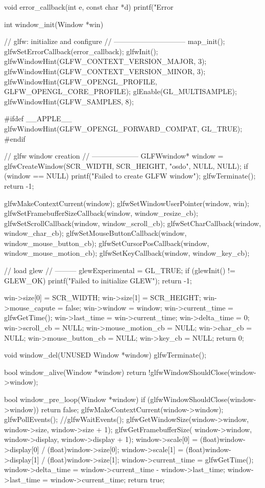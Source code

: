 \documentclass[14pt,a4paper]{extarticle}
\theoremstyle{definition}
\renewcommand{\[}{\begin{singlespace}\begin{equation*}}
\renewcommand{\]}{\end{equation*}\end{singlespace}}
\begin{document}
\begin{multicols}{2}
\begin{ccode}
void error_callback(int e, const char *d) {
    printf("Error %
}

int window_init(Window *win) {
    // glfw: initialize and configure
    // ------------------------------
    map_init();
    glfwSetErrorCallback(error_callback);
    glfwInit();
    glfwWindowHint(GLFW_CONTEXT_VERSION_MAJOR, 3);
    glfwWindowHint(GLFW_CONTEXT_VERSION_MINOR, 3);
    glfwWindowHint(GLFW_OPENGL_PROFILE, GLFW_OPENGL_CORE_PROFILE);
    glEnable(GL_MULTISAMPLE);
    glfwWindowHint(GLFW_SAMPLES, 8);

#ifdef __APPLE__
    glfwWindowHint(GLFW_OPENGL_FORWARD_COMPAT, GL_TRUE);
#endif

    // glfw window creation
    // --------------------
    GLFWwindow* window = glfwCreateWindow(SCR_WIDTH, SCR_HEIGHT, "osdo",
                                          NULL, NULL);
    if (window == NULL) {
        printf("Failed to create GLFW window\n");
        glfwTerminate();
        return -1;
    }

    glfwMakeContextCurrent(window);
    glfwSetWindowUserPointer(window, win);
    glfwSetFramebufferSizeCallback(window, window_resize_cb);
    glfwSetScrollCallback(window, window_scroll_cb);
    glfwSetCharCallback(window, window_char_cb);
    glfwSetMouseButtonCallback(window, window_mouse_button_cb);
    glfwSetCursorPosCallback(window, window_mouse_motion_cb);
    glfwSetKeyCallback(window, window_key_cb);

    // load glew
    // ---------
    glewExperimental = GL_TRUE;
    if (glewInit() != GLEW_OK) {
        printf("Failed to initialize GLEW\n");
        return -1;
    }

    win->size[0] = SCR_WIDTH;
    win->size[1] = SCR_HEIGHT;
    win->mouse_capute = false;
    win->window = window;
    win->current_time = glfwGetTime();
    win->last_time = win->current_time;
    win->delta_time = 0;
    win->scroll_cb = NULL;
    win->mouse_motion_cb = NULL;
    win->char_cb = NULL;
    win->mouse_button_cb = NULL;
    win->key_cb = NULL;
    return 0;
}

void window_del(UNUSED Window *window) {
    glfwTerminate();
}

bool window_alive(Window *window) {
    return !glfwWindowShouldClose(window->window);
}

bool window_pre_loop(Window *window) {
    if (glfwWindowShouldClose(window->window)) return false;
    glfwMakeContextCurrent(window->window);
    glfwPollEvents();
    //glfwWaitEvents();
    glfwGetWindowSize(window->window, window->size, window->size + 1);
    glfwGetFramebufferSize(
                window->window, window->display, window->display + 1);
    window->scale[0] = (float)window->display[0] / (float)window->size[0];
    window->scale[1] = (float)window->display[1] / (float)window->size[1];
    window->current_time = glfwGetTime();
    window->delta_time = window->current_time - window->last_time;
    window->last_time = window->current_time;
    return true;
}


\end{ccode}
\end{multicols}
\end{document}
